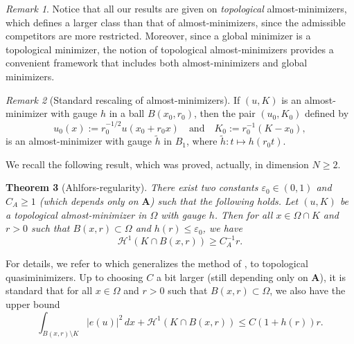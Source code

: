 \documentclass[12pt]{article}
\newtheorem{theorem}{Theorem}[section]
\theoremstyle{definition}
\theoremstyle{remark}
\newtheorem{remark}[theorem]{Remark}
\numberwithin{equation}{section}
\newcommand{\A}{\mathbf{A}}
\renewcommand{\H}{\mathcal{H}}
\begin{document}
\begin{remark}Notice that all our results are given on \emph{topological} almost-minimizers, which defines a larger class than that of almost-minimizers, since the admissible competitors are more restricted.  Moreover, since a global minimizer is a topological minimizer, the notion of  topological almost-minimizers provides a convenient framework that includes both almost-minimizers and global minimizers. 
\end{remark}


\begin{remark}[Standard rescaling of almost-minimizers]\label{rmk_scaling}
    If $(u,K)$ is an almost-minimizer with gauge $h$ in a   ball $B(x_0,r_0)$, then the pair $(u_0,K_0)$ defined by
    \begin{equation}
        u_0(x) := r_0^{-1/2} u(x_0 + r_0 x) \quad \text{and} \quad K_0 := r_0^{-1}(K - x_0),
    \end{equation}
    is an almost-minimizer with gauge $\tilde{h}$ in $B_1$, where $\tilde{h} : t \mapsto h(r_0 t)$.
\end{remark}

We recall the following result, which was proved, actually, in dimension $N\geq 2$.

\begin{theorem}[Ahlfors-regularity]\label{ARTheorem}
    There exist two constants $\varepsilon_0 \in (0,1)$ and $C_A \geq 1$ (which depends only on $\A$) such that the following holds.
    Let $(u,K)$ be a topological almost-minimizer in $\Omega$ with gauge $h$.
    Then for all $x \in \Omega \cap K$ and $r > 0$ such that $B(x,r) \subset \Omega$ and $h(r) \leq \varepsilon_0$, we have
    \begin{equation}\label{eq_AR1}
        \H^1(K \cap B(x,r)) \geq C_A^{-1} r.
    \end{equation}
\end{theorem}
For details, we refer to \cite{FLK2} which generalizes the method of \cite{CCI}, \cite{CFI} to topological quasiminimizers.
Up to choosing $C$ a bit larger (still depending only on $\A$), it is standard that for all $x \in \Omega$ and $r > 0$
such that $B(x,r) \subset \Omega$, we also have the upper bound
\begin{equation}\label{eq_AR2}
    \int_{B(x,r)\setminus K} |e(u)|^2 \, dx + \H^1(K \cap B(x,r)) \leq C(1 + h(r)) r.
\end{equation}
\end{document}
